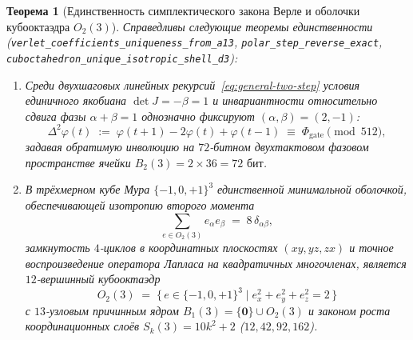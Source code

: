 \documentclass[11pt,a4paper]{article}
\theoremstyle{plain}
\newtheorem{theorem}{Теорема}[section]
\theoremstyle{definition}
\begin{document}
\begin{theorem}[Единственность симплектического закона Верле и оболочки кубооктаэдра $O_2(3)$]
\label{thm:d3-verlet-cuboct}
Справедливы следующие теоремы единственности (\texttt{verlet\_coefficients\_uniqueness\_from\_a13}, \texttt{polar\_step\_reverse\_exact}, \texttt{cuboctahedron\_unique\_isotropic\_shell\_d3}):
\begin{enumerate}[label=\textbf{(\arabic*)},leftmargin=*]
\item Среди двухшаговых линейных рекурсий~\eqref{eq:general-two-step} условия единичного якобиана $\det J = -\beta = 1$ и инвариантности относительно сдвига фазы $\alpha + \beta = 1$ однозначно фиксируют $(\alpha, \beta) = (2, -1)$:
  \begin{equation}
    \label{eq:verlet-law}
    \Delta^2\varphi(t) \;:=\; \varphi(t+1) - 2\varphi(t) + \varphi(t-1) \;\equiv\; \Phi_{\mathrm{gate}} \pmod{512},
  \end{equation}
  задавая обратимую инволюцию на $72$-битном двухтактовом фазовом пространстве ячейки $B_2(3) = 2\times 36 = 72\text{ бит}$.
\item В трёхмерном кубе Мура $\{-1,0,+1\}^3$ единственной минимальной оболочкой, обеспечивающей изотропию второго момента
  \begin{equation}
    \label{eq:o2-second-moment}
    \sum_{e\in O_2(3)} e_\alpha e_\beta \;=\; 8\,\delta_{\alpha\beta},
  \end{equation}
  замкнутость $4$-циклов в координатных плоскостях $(xy,yz,zx)$ и точное воспроизведение оператора Лапласа на квадратичных многочленах, является $12$-вершинный кубооктаэдр
  \begin{equation}
    \label{eq:o2-def}
    O_2(3) \;=\; \bigl\{\,e\in\{-1,0,+1\}^3 \;\big|\; e_x^2 + e_y^2 + e_z^2 = 2\,\bigr\}
  \end{equation}
  с $13$-узловым причинным ядром $B_1(3) = \{\mathbf{0}\}\cup O_2(3)$ и законом роста координационных слоёв $S_k(3) = 10k^2 + 2$ ($12, 42, 92, 162$).
\end{enumerate}
\end{theorem}
\end{document}
